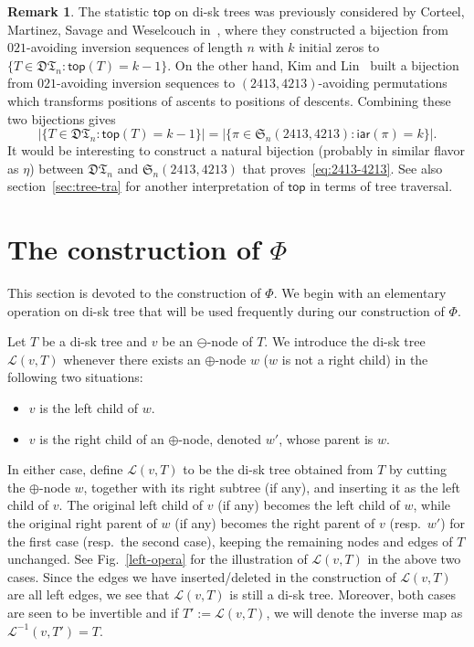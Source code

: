 \documentclass[12pt]{amsart}
\numberwithin{equation}{section}
\theoremstyle{plain}
\theoremstyle{definition}
\newtheorem{remark}[theorem]{Remark}
\def\S{\mathfrak{S}}
\def\iar{\mathsf{iar}}
\newcommand{\DT}{\mathfrak{DT}}
\def\top{\mathsf{top}}
\begin{document}
\begin{remark}
The statistic $\top$ on di-sk trees was previously considered by Corteel, Martinez, Savage and Weselcouch in~\cite[Corollary~5]{cor}, where they constructed a bijection from $021$-avoiding inversion sequences of length $n$ with $k$ initial zeros  to $\{T\in\DT_n: \top(T)=k-1\}$. 
On the other hand, Kim and Lin~\cite{LK} built a bijection from $021$-avoiding inversion sequences to $(2413,4213)$-avoiding permutations which transforms positions of ascents to positions of descents. Combining these two bijections gives
\begin{equation}\label{eq:2413-4213}
|\{T\in\DT_n: \top(T)=k-1\}|=|\{\pi\in\S_n(2413,4213): \iar(\pi)=k\}|. 
\end{equation}
It would be interesting to construct a natural bijection (probably in similar flavor  as $\eta$) between $\DT_n$ and $\S_n(2413,4213)$ that proves~\eqref{eq:2413-4213}. 
See also section~\ref{sec:tree-tra} for another interpretation of $\top$ in terms of tree traversal.
\end{remark}


\section{The construction of \texorpdfstring{$\Phi$}{Phi}}\label{sec:constr of phi}

This section is devoted to the construction of $\Phi$. We begin with an elementary operation on di-sk tree that will be used frequently during our construction of $\Phi$. 

Let $T$ be a di-sk tree and $v$ be an $\ominus$-node of $T$. We introduce the di-sk tree $\mathcal{L}(v,T)$ whenever  there exists an $\oplus$-node $w$ ($w$ is not a right child) in the following two situations: 
\begin{itemize}
\item $v$ is the left child of $w$. 
\item $v$ is the right child of an $\oplus$-node, denoted $w'$, whose parent is $w$. 
\end{itemize}
In either case, define $\mathcal{L}(v,T)$ to be the di-sk tree obtained from $T$ by cutting the $\oplus$-node $w$, together with its right subtree (if any), and inserting it as the left child of $v$. The original left child of $v$ (if any) becomes the left child of $w$, while the original right parent of $w$ (if any) becomes the right parent of $v$ (resp.~$w'$) for the first case (resp.~the second case), keeping the remaining nodes and edges of $T$ unchanged. See Fig.~\ref{left-opera} for the illustration of $\mathcal{L}(v,T)$ in the above two cases. Since the edges we have inserted/deleted in the construction of $\mathcal{L}(v,T)$ are all left edges, we see that $\mathcal{L}(v,T)$ is still a di-sk tree. Moreover, both cases are seen to be invertible and if $T':=\mathcal{L}(v,T)$, we will denote the inverse map as $\mathcal{L}^{-1}(v,T')=T$.
\end{document}
